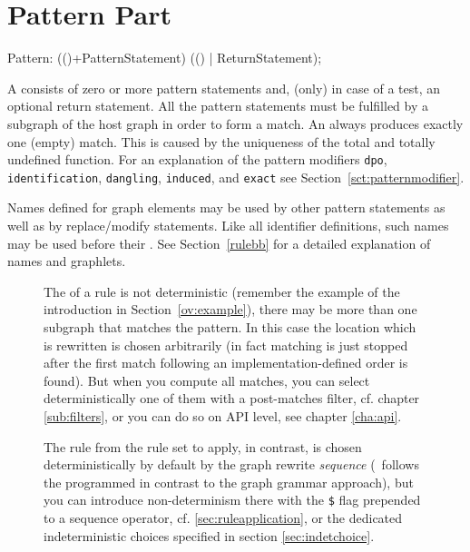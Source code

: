 \section{Pattern Part}  
\label{patternpart}
\begin{rail}
  Pattern: (()+PatternStatement) (() | ReturnStatement);
\end{rail}
A  consists of zero or more pattern statements and, (only) in case of a test, an optional return statement.
All the pattern statements must be fulfilled by a subgraph of the host graph in order to form a match.
An  always produces exactly one (empty) match.
This is caused by the uniqueness of the total and totally undefined function.
For an explanation of the pattern modifiers \texttt{dpo}, \texttt{identification}, \texttt{dangling}, \texttt{induced}, and \texttt{exact} see Section~\ref{sct:patternmodifier}.

Names defined for graph elements may be used by other pattern statements as well as by replace/modify statements.
Like all identifier definitions, such names may be used before their .
See Section~\ref{rulebb} for a detailed explanation of names and graphlets.

\begin{figure}[htbp]
\begin{warning}
\label{note:indeterminism}
The  of a rule is not deterministic (remember the example of the introduction in Section~\ref{ov:example}), there may be more than one subgraph that matches the pattern.
In this case the location which is rewritten is chosen arbitrarily (in fact matching is just stopped after the first match following an implementation-defined order is found).
But when you compute all matches, you can select deterministically one of them with a post-matches filter, cf. chapter \ref{sub:filters}, or you can do so on API level, see chapter \ref{cha:api}.

The rule from the rule set to apply, in contrast, is chosen deterministically by default by the graph rewrite \emph{sequence}  (\GrG\ follows the programmed in contrast to the graph grammar approach),
but you can introduce non-determinism there with the \texttt{\$} flag prepended to a sequence operator, cf. \ref{sec:ruleapplication}, or the dedicated indeterministic choices specified in section \ref{sec:indetchoice}.
\end{warning}
\end{figure}

